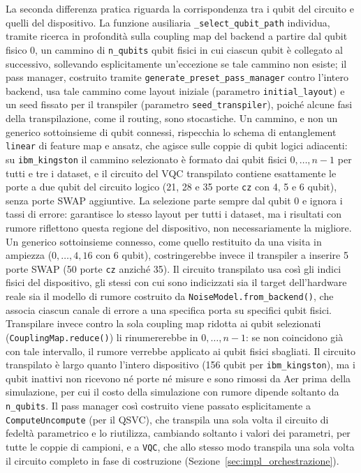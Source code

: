 \begin{sloppypar}
La seconda differenza pratica riguarda la corrispondenza tra i qubit del circuito e quelli del dispositivo. La funzione ausiliaria \texttt{\_select\_qubit\_path} individua, tramite ricerca in profondità sulla coupling map del backend a partire dal qubit fisico 0, un cammino di \texttt{n\_qubits} qubit fisici in cui ciascun qubit è collegato al successivo, sollevando esplicitamente un'eccezione se tale cammino non esiste; il pass manager, costruito tramite \texttt{generate\_preset\_pass\_manager} contro l'intero backend, usa tale cammino come layout iniziale (parametro \texttt{initial\_layout}) e un seed fissato per il transpiler (parametro \texttt{seed\_transpiler}), poiché alcune fasi della transpilazione, come il routing, sono stocastiche. Un cammino, e non un generico sottoinsieme di qubit connessi, rispecchia lo schema di entanglement \texttt{linear} di feature map e ansatz, che agisce sulle coppie di qubit logici adiacenti: su \texttt{ibm\_kingston} il cammino selezionato è formato dai qubit fisici $0, \dots, n-1$ per tutti e tre i dataset, e il circuito del VQC transpilato contiene esattamente le porte a due qubit del circuito logico (21, 28 e 35 porte \texttt{cz} con 4, 5 e 6 qubit), senza porte SWAP aggiuntive. La selezione parte sempre dal qubit 0 e ignora i tassi di errore: garantisce lo stesso layout per tutti i dataset, ma i risultati con rumore riflettono questa regione del dispositivo, non necessariamente la migliore. Un generico sottoinsieme connesso, come quello restituito da una visita in ampiezza ($0, \dots, 4, 16$ con 6 qubit), costringerebbe invece il transpiler a inserire 5 porte SWAP (50 porte \texttt{cz} anziché 35). Il circuito transpilato usa così gli indici fisici del dispositivo, gli stessi con cui sono indicizzati sia il target dell'hardware reale sia il modello di rumore costruito da \texttt{NoiseModel.from\_backend()}, che associa ciascun canale di errore a una specifica porta su specifici qubit fisici. Transpilare invece contro la sola coupling map ridotta ai qubit selezionati (\texttt{CouplingMap.reduce()}) li rinumererebbe in $0, \dots, n-1$: se non coincidono già con tale intervallo, il rumore verrebbe applicato ai qubit fisici sbagliati. Il circuito transpilato è largo quanto l'intero dispositivo (156 qubit per \texttt{ibm\_kingston}), ma i qubit inattivi non ricevono né porte né misure e sono rimossi da Aer prima della simulazione, per cui il costo della simulazione con rumore dipende soltanto da \texttt{n\_qubits}. Il pass manager così costruito viene passato esplicitamente a \texttt{ComputeUncompute} (per il QSVC), che transpila una sola volta il circuito di fedeltà parametrico e lo riutilizza, cambiando soltanto i valori dei parametri, per tutte le coppie di campioni, e a \texttt{VQC}, che allo stesso modo transpila una sola volta il circuito completo in fase di costruzione (Sezione~\ref{sec:impl_orchestrazione}).
\end{sloppypar}

